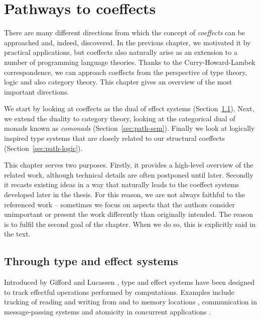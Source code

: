 

\chapter{Pathways to coeffects} 
\label{ch:pathways} 


There are many different directions from which the concept of \emph{coeffects} can be approached 
and, indeed, discovered. In the previous chapter, we motivated it by practical applications, but 
coeffects also naturally arise as an extension to a number of programming language theories.
Thanks to the Curry-Howard-Lambek correspondence, we can approach coeffects from the perspective of 
type theory, logic and also category theory. This chapter gives an overview of the most 
important directions.

We start by looking at coeffects as the dual of effect systems (Section~\ref{sec:path-eff}). Next,
we extend the duality to category theory, looking at the categorical dual of monads known as 
\emph{comonads} (Section~\ref{sec:path-sem}). Finally we look at logically inspired type systems 
that are closely related to our structural coeffects (Section~\ref{sec:path-logic}).

This chapter serves two purposes. Firstly, it provides a high-level overview of the  related work, 
although technical details are often postponed until later. Secondly it recasts existing ideas in 
a way that naturally leads to the coeffect systems developed later in the thesis. For this reason, 
we are not always faithful to the referenced work -- sometimes we focus on aspects that the 
authors consider unimportant or present the work differently than originally intended. The reason 
is to fulfil the second goal of the chapter. When we do so, this is explicitly said in the text.


\section{Through type and effect systems}
\label{sec:path-eff}

Introduced by Gifford and Lucassen \cite{effects-gifford,effects-polymorphic}, type and effect 
systems have been designed to track effectful operations performed by computations. Examples 
include tracking of reading and writing from and to memory locations \cite{effects-talpin-et-al}, 
communication in message-passing systems \cite{effects-messagepassing} and atomicity in concurrent 
applications \cite{effects-atomicity}.


